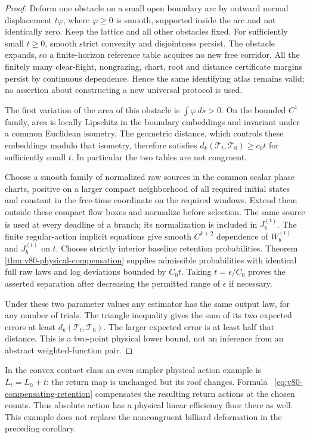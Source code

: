 \begin{proof}
Deform one obstacle on a small open boundary arc by outward normal
displacement $t\varphi$, where $\varphi\ge0$ is smooth, supported
inside the arc and not identically zero.  Keep the lattice and all
other obstacles fixed.  For sufficiently small $t\ge0$, smooth strict
convexity and disjointness persist.  The obstacle expands, so a
finite-horizon reference table acquires no new free corridor.
All the finitely many clear-flight, nongrazing, chart, root and distance
certificate margins persist by continuous dependence.  Hence the same
identifying atlas remains valid; no assertion about constructing a new
universal protocol is used.

The first variation of the area of this obstacle is
$\int\varphi\,ds>0$.  On the bounded $C^1$ family, area is locally
Lipschitz in the boundary embeddings and invariant under a common
Euclidean isometry.  The geometric distance, which controls these
embeddings modulo that isometry, therefore satisfies
$d_k(\mathcal T_t,\mathcal T_0)\ge c_0t$ for sufficiently small $t$.
In particular the two tables are not congruent.

Choose a smooth family of normalized raw sources in the common scalar
phase charts, positive on a larger compact neighborhood of all required
initial states and constant in the free-time coordinate on the required
windows.  Extend them outside these compact flow boxes and normalize
before selection.  The same source is used at every deadline of a
branch; its normalization is included in $J_b^{(t)}$.  The finite regular-action implicit equations give smooth
$C^{k+2}$ dependence of $W_b^{(t)}$ and $J_b^{(t)}$ on $t$.
Choose strictly interior baseline retention probabilities.  Theorem~
\ref{thm:v80-physical-compensation} supplies admissible probabilities
with identical full raw laws and log deviations bounded by $C_0t$.
Taking $t=\epsilon/C_0$ proves the asserted separation after decreasing
the permitted range of $\epsilon$ if necessary.

Under these two parameter values any estimator has the same output
law, for any number of trials.  The triangle inequality gives the sum
of its two expected errors at least $d_k(\mathcal T_t,\mathcal T_0)$.
The larger expected error is at least half that distance.  This is a
two-point physical lower bound, not an inference from an abstract
weighted-function pair.
\end{proof}

In the convex contact class an even simpler physical action example is
$L_t=L_0+t$: the return map is unchanged but its roof changes.  Formula~
\eqref{eq:v80-compensating-retention} compensates the resulting return
actions at the chosen counts.  Thus absolute action has a physical
linear efficiency floor there as well.  This example does not replace
the noncongruent billiard deformation in the preceding corollary.

